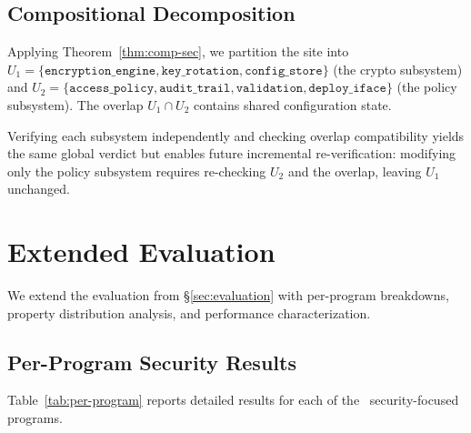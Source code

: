 \documentclass[11pt]{article}
\begin{document}
\subsection{Compositional Decomposition}

Applying Theorem~\ref{thm:comp-sec}, we partition the site into
$U_1 = \{\texttt{encryption\_engine}, \texttt{key\_rotation},
\texttt{config\_store}\}$ (the crypto subsystem) and
$U_2 = \{\texttt{access\_policy}, \texttt{audit\_trail},
\texttt{validation}, \texttt{deploy\_iface}\}$ (the policy subsystem).
The overlap $U_1 \cap U_2$ contains shared configuration state.

Verifying each subsystem independently and checking overlap
compatibility yields the same global verdict but enables future
incremental re-verification: modifying only the policy subsystem
requires re-checking $U_2$ and the overlap, leaving $U_1$ unchanged.

\section{Extended Evaluation}\label{sec:extended-eval}

We extend the evaluation from \S\ref{sec:evaluation} with
per-program breakdowns, property distribution analysis, and
performance characterization.

\subsection{Per-Program Security Results}

Table~\ref{tab:per-program} reports detailed results for each of the
\ppLXIXprogramCount\ security-focused programs.
\end{document}
